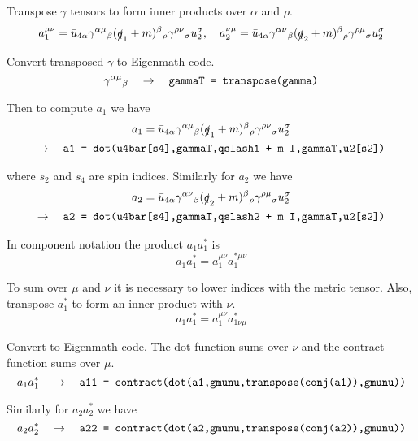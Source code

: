 \documentclass[12pt]{article}
\begin{document}
Transpose $\gamma$ tensors to form inner products over $\alpha$ and $\rho$.
\begin{equation*}
a_1^{\mu\nu}
=\bar{u}_{4\alpha}\gamma^{\alpha\mu}{}_\beta(\slashed{q}_1+m)^\beta{}_\rho\gamma^{\rho\nu}{}_\sigma u_2^\sigma,
\quad
a_2^{\nu\mu}
=\bar{u}_{4\alpha}\gamma^{\alpha\nu}{}_\beta(\slashed{q}_2+m)^\beta{}_\rho\gamma^{\rho\mu}{}_\sigma u_2^\sigma
\end{equation*}

Convert transposed $\gamma$ to Eigenmath code.
\begin{equation*}
\gamma^{\alpha\mu}{}_\beta
\quad\rightarrow\quad
\text{\tt gammaT = transpose(gamma)}
\end{equation*}

Then to compute $a_1$ we have
\begin{multline*}
a_1=\bar{u}_{4\alpha}\gamma^{\alpha\mu}{}_\beta(\slashed{q}_1+m)^\beta{}_\rho\gamma^{\rho\nu}{}_\sigma u_2^\sigma
\\
\rightarrow\quad
\text{\tt a1 = dot(u4bar[s4],gammaT,qslash1 + m I,gammaT,u2[s2])}
\end{multline*}

where $s_2$ and $s_4$ are spin indices.
Similarly for $a_2$ we have
\begin{multline*}
a_2=\bar{u}_{4\alpha}\gamma^{\alpha\nu}{}_\beta(\slashed{q}_2+m)^\beta{}_\rho\gamma^{\rho\mu}{}_\sigma u_2^\sigma
\\
\rightarrow\quad
\text{\tt a2 = dot(u4bar[s4],gammaT,qslash2 + m I,gammaT,u2[s2])}
\end{multline*}

In component notation the product $a_1a_1^*$ is
\begin{equation*}
a_1a_1^*=a_1^{\mu\nu}a_1^{*\mu\nu}
\end{equation*}

To sum over $\mu$ and $\nu$ it is necessary to lower indices with the metric tensor.
Also, transpose $a_1^*$ to form an inner product with $\nu$.
\begin{equation*}
a_1a_1^*=a_1^{\mu\nu}a_{1\nu\mu}^*
\end{equation*}

Convert to Eigenmath code.
The dot function sums over $\nu$ and the contract function sums over $\mu$.
\begin{equation*}
a_1a_1^*
\quad\rightarrow\quad
\text{\tt a11 = contract(dot(a1,gmunu,transpose(conj(a1)),gmunu))}
\end{equation*}

Similarly for $a_2a_2^*$ we have
\begin{equation*}
a_2a_2^*
\quad\rightarrow\quad
\text{\tt a22 = contract(dot(a2,gmunu,transpose(conj(a2)),gmunu))}
\end{equation*}
\end{document}
